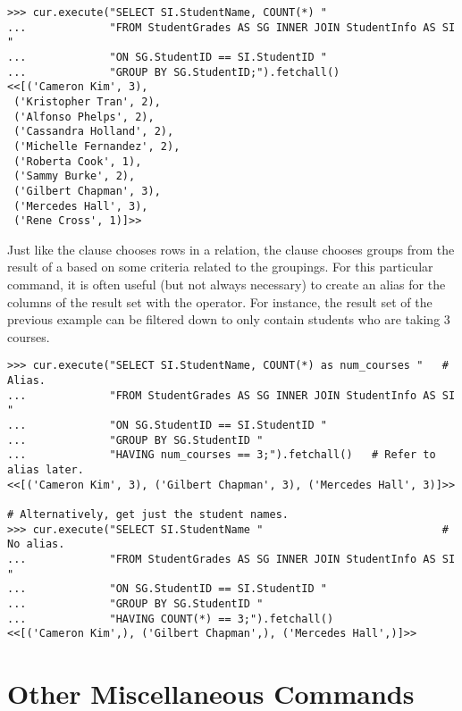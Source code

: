 \begin{lstlisting}
>>> cur.execute("SELECT SI.StudentName, COUNT(*) "
...             "FROM StudentGrades AS SG INNER JOIN StudentInfo AS SI "
...             "ON SG.StudentID == SI.StudentID "
...             "GROUP BY SG.StudentID;").fetchall()
<<[('Cameron Kim', 3),
 ('Kristopher Tran', 2),
 ('Alfonso Phelps', 2),
 ('Cassandra Holland', 2),
 ('Michelle Fernandez', 2),
 ('Roberta Cook', 1),
 ('Sammy Burke', 2),
 ('Gilbert Chapman', 3),
 ('Mercedes Hall', 3),
 ('Rene Cross', 1)]>>
\end{lstlisting}

Just like the  clause chooses rows in a relation, the  clause chooses groups from the result of a  based on some criteria related to the groupings.
For this particular command, it is often useful (but not always necessary) to create an alias for the columns of the result set with the  operator.
For instance, the result set of the previous example can be filtered down to only contain students who are taking 3 courses.

\begin{lstlisting}
>>> cur.execute("SELECT SI.StudentName, COUNT(*) as num_courses "   # Alias.
...             "FROM StudentGrades AS SG INNER JOIN StudentInfo AS SI "
...             "ON SG.StudentID == SI.StudentID "
...             "GROUP BY SG.StudentID "
...             "HAVING num_courses == 3;").fetchall()   # Refer to alias later.
<<[('Cameron Kim', 3), ('Gilbert Chapman', 3), ('Mercedes Hall', 3)]>>

# Alternatively, get just the student names.
>>> cur.execute("SELECT SI.StudentName "                            # No alias.
...             "FROM StudentGrades AS SG INNER JOIN StudentInfo AS SI "
...             "ON SG.StudentID == SI.StudentID "
...             "GROUP BY SG.StudentID "
...             "HAVING COUNT(*) == 3;").fetchall()
<<[('Cameron Kim',), ('Gilbert Chapman',), ('Mercedes Hall',)]>>
\end{lstlisting}


\section*{Other Miscellaneous Commands} %

